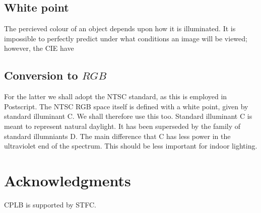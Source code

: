 \documentclass[useAMS,usedcolumn,usegraphicx,usenatbib]{mn2e}
\begin{document}
\subsection{White point}

The percieved colour of an object depends upon how it is illuminated. It is impossible to perfectly predict under what conditions an image will be viewed; however, the CIE have 

\subsection{Conversion to $RGB$}

For the latter we shall adopt the NTSC standard, as this is employed in Postscript. The NTSC RGB space itself is defined with a white point, given by standard illuminant C. We shall therefore use this too. Standard illuminant C is meant to represent natural daylight. It has been superseded by the family of standard illumniants D. The main difference that C has less power in the ultraviolet end of the spectrum.  This should be less important for indoor lighting.

\section*{Acknowledgments}

CPLB is supported by STFC.




\appendix



\bsp

\label{lastpage}
\end{document}
